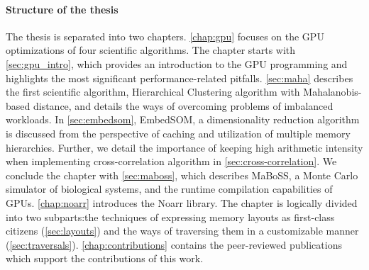 \paragraph{Structure of the thesis}

The thesis is separated into two chapters. \cref{chap:gpu} focuses on the GPU optimizations of four scientific algorithms. The chapter starts with \cref{sec:gpu_intro}, which provides an introduction to the GPU programming and highlights the most significant performance-related pitfalls. \cref{sec:maha} describes the first scientific algorithm, Hierarchical Clustering algorithm with Mahalanobis-based distance, and details the ways of overcoming problems of imbalanced workloads. In \cref{sec:embedsom}, EmbedSOM, a dimensionality reduction algorithm is discussed from the perspective of caching and utilization of multiple memory hierarchies. Further, we detail the importance of keeping high arithmetic intensity when implementing cross-correlation algorithm in \cref{sec:cross-correlation}. We conclude the chapter with \cref{sec:maboss}, which describes MaBoSS, a Monte Carlo simulator of biological systems, and the runtime compilation capabilities of GPUs. \cref{chap:noarr} introduces the Noarr library. The chapter is logically divided into two subparts:the techniques of expressing memory layouts as first-class citizens (\cref{sec:layouts}) and the ways of traversing them in a customizable manner (\cref{sec:traversals}). \cref{chap:contributions} contains the peer-reviewed publications which support the contributions of this work.

